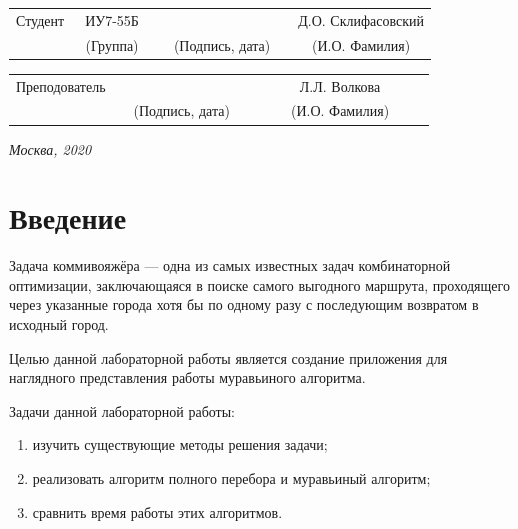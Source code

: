 \documentclass[14pt, a4paper]{extarticle}
\begin{document}
\noindent
{}
\\

\noindent
{}
\\

\vspace{1.5cm}
\noindent
\begin{tabular}{l c c c c c}
	Студент      & ~ИУ7-55Б~               & \hspace{2.5cm} & \hspace{2cm}                 & &  Д.О. Склифасовский \\\cline{2-2}\cline{4-4} \cline{6-6} 
	\hspace{3cm} & {\footnotesize(Группа)} &                & {\footnotesize(Подпись, дата)} & & {\footnotesize(И.О. Фамилия)}
\end{tabular}

\noindent
\begin{tabular}{l c c c c}
	Преподователь & \hspace{5cm}   & \hspace{2cm}                 & & ~~~~~~Л.Л. Волкова~~~~~~\\\cline{3-3} \cline{5-5} 
	\hspace{3cm}  &                & {\footnotesize(Подпись, дата)} & & {\footnotesize(И.О. Фамилия)}
\end{tabular}

\vspace{0.6cm}
\begin{center}	
	\vfill
	\large \textit {Москва, 2020}
\end{center}

\thispagestyle {empty}
\pagebreak

\clearpage
\tableofcontents

\clearpage
\section*{Введение}
Задача коммивояжёра — одна из самых известных задач комбинаторной оптимизации, заключающаяся в поиске самого выгодного маршрута, проходящего через указанные города хотя бы по одному разу с последующим возвратом в исходный город.\par
Целью данной лабораторной работы является создание приложения для наглядного представления работы муравьиного алгоритма.\par
Задачи данной лабораторной работы:
\begin{enumerate}
	\item[1)] изучить существующие методы решения задачи;
	\item[2)] реализовать алгоритм полного перебора и муравьиный алгоритм;
	\item[3)] сравнить время работы этих алгоритмов.
\end{enumerate} 
\end{document}
